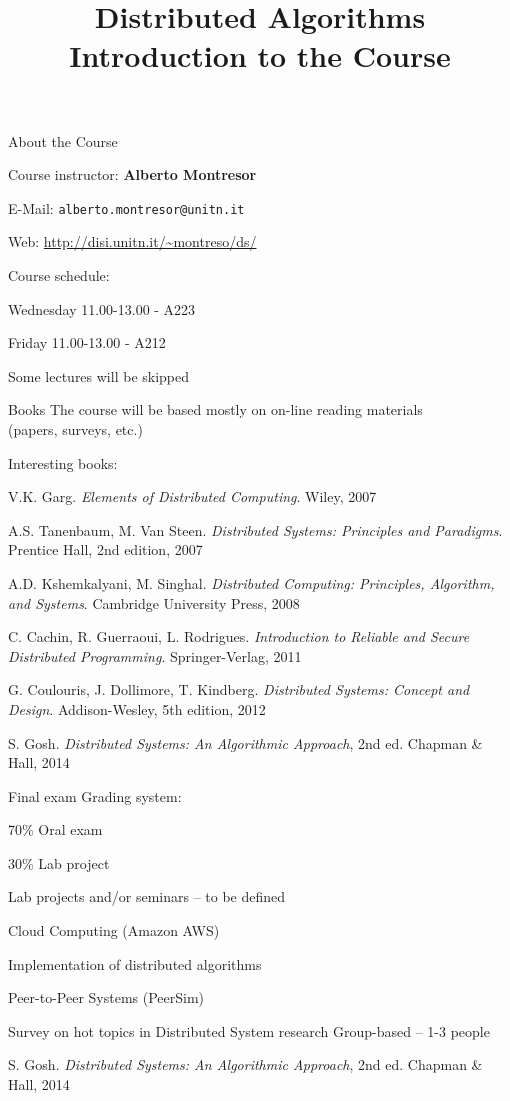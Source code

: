 
\title[DS - Introduction]{\textbf{Distributed Algorithms}\\Introduction to the Course}



\FrameTitle{}

\begin{PlainFrame}{About the Course}

Course instructor: \textbf{Alberto Montresor}
\BI
\item E-Mail: \texttt{alberto.montresor@unitn.it}
\item Web: \url{http://disi.unitn.it/~montreso/ds/}
\EI


\bigskip
Course schedule:
\BI
\item Wednesday 11.00-13.00 - A223
\item Friday 11.00-13.00 - A212
\item Some lectures will be skipped
\EI

\end{PlainFrame}


\begin{PlainFrame}{Books}
The course will be based mostly on on-line reading materials\\ (papers, surveys, etc.)

\bigskip
Interesting books:
{\small 
\BI
\item V.K. Garg. \emph{Elements of Distributed Computing}. Wiley, 2007
\item A.S. Tanenbaum, M. Van Steen. \emph{Distributed Systems: Principles and Paradigms}. Prentice Hall, 2nd edition, 2007
\item A.D. Kshemkalyani, M. Singhal. \emph{Distributed Computing: Principles, Algorithm, and Systems}. Cambridge University Press, 2008
\item C. Cachin, R. Guerraoui, L. Rodrigues. \emph{Introduction to Reliable and Secure Distributed Programming}. Springer-Verlag, 2011
\item G. Coulouris, J. Dollimore, T. Kindberg. \emph{Distributed Systems: Concept and Design}. Addison-Wesley, 5th edition, 2012
\item \alert{S. Gosh. \emph{Distributed Systems: An Algorithmic Approach}, 2nd ed. Chapman \& Hall, 2014}
\EI	
}
\end{PlainFrame}

\begin{PlainFrame}{Final exam}
Grading system:
\BI
\item 70\% Oral exam
\item 30\% Lab project
\EI	
	
\bigskip
Lab projects and/or seminars -- to be defined
\BI
\item Cloud Computing (Amazon AWS)
\item Implementation of distributed algorithms
\item Peer-to-Peer Systems (PeerSim)
\item Survey on hot topics in Distributed System research
\EI
\bigskip
Group-based -- 1-3 people

\end{PlainFrame}

\begin{RMFrame}
	
\BI
\item S. Gosh. \emph{Distributed Systems: An Algorithmic Approach}, 2nd ed. Chapman \& Hall, 2014
\EI

\end{RMFrame}

 

